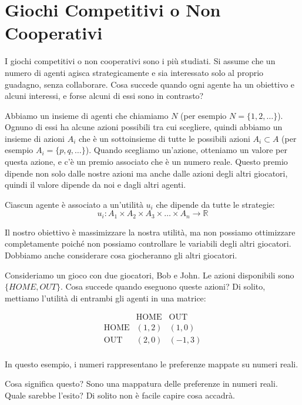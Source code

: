 \section{Giochi Competitivi o Non Cooperativi}

I giochi competitivi o non cooperativi sono i più studiati. Si assume che un
numero di agenti agisca strategicamente e sia interessato solo al proprio
guadagno, senza collaborare. Cosa succede quando ogni agente ha un obiettivo e
alcuni interessi, e forse alcuni di essi sono in contrasto?

Abbiamo un insieme di agenti che chiamiamo $N$ (per esempio $N =
    \{1,2,\ldots\}$). Ognuno di essi ha alcune azioni possibili tra cui scegliere,
quindi abbiamo un insieme di azioni $A_i$ che è un sottoinsieme di tutte le
possibili azioni $A_i \subset A$ (per esempio $A_i = \{p, q, \ldots\}$). Quando
scegliamo un'azione, otteniamo un valore per questa azione, e c'è un premio
associato che è un numero reale. Questo premio dipende non solo dalle nostre
azioni ma anche dalle azioni degli altri giocatori, quindi il valore dipende da
noi e dagli altri agenti.

Ciascun agente è associato a un'utilità $u_i$ che dipende da tutte le
strategie:
\[u_i : A_1 \times A_2 \times A_3 \times \ldots \times A_n \to \mathbb{R}\]

Il nostro obiettivo è massimizzare la nostra utilità, ma non possiamo
ottimizzare completamente poiché non possiamo controllare le variabili degli
altri giocatori. Dobbiamo anche considerare cosa giocheranno gli altri
giocatori.

Consideriamo un gioco con due giocatori, Bob e John. Le azioni disponibili sono
$\{HOME, OUT\}$. Cosa succede quando eseguono queste azioni? Di solito,
mettiamo l'utilità di entrambi gli agenti in una matrice:

\[
    \begin{array}{ccc}
                    & \text{HOME} & \text{OUT} \\
        \text{HOME} & (1, 2)      & (1, 0)     \\
        \text{OUT}  & (2, 0)      & (-1, 3)    \\
    \end{array}
\]

In questo esempio, i numeri rappresentano le preferenze mappate su numeri
reali.

Cosa significa questo? Sono una mappatura delle preferenze in numeri reali.
Quale sarebbe l'esito? Di solito non è facile capire cosa accadrà.

